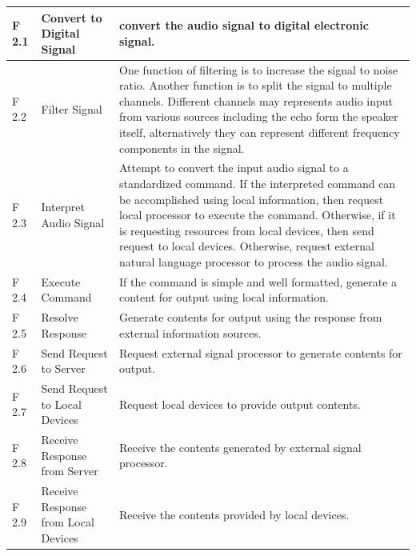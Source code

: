 \documentclass{article}
\begin{document}
\begin{center}
\begin{longtable}{| m{} | m{} | m{} |}
 F 2.1 & Convert to Digital Signal & convert the audio signal to digital electronic signal.\\ 
 \hline
 F 2.2 & Filter Signal & One function of filtering is to increase the signal to noise ratio. Another function is to split the signal to multiple channels. Different channels may represents audio input from various sources including the echo form the speaker itself, alternatively they can represent different frequency components in the signal.\\ 
 \hline
 F 2.3 & Interpret Audio Signal & Attempt to convert the input audio signal to a standardized command. If the interpreted command can be accomplished using local information, then request local processor to execute the command. Otherwise, if it is requesting resources from local devices, then send request to local devices. Otherwise, request external natural language processor to process the audio signal.\\ 
 \hline
 F 2.4 & Execute Command & If the command is simple and  well formatted, generate a content for output using local information.\\ 
 \hline
 F 2.5 & Resolve Response & Generate contents for output using the response from external information sources.\\ 
 \hline
 F 2.6 & Send Request to Server & Request external signal processor to generate contents for output.\\ 
 \hline
 F 2.7 & Send Request to Local Devices & Request local devices to provide output contents.\\ 
 \hline
 F 2.8 & Receive Response from Server & Receive the contents generated by external signal processor.\\ 
 \hline
 F 2.9 & Receive Response from Local Devices & Receive the contents provided by local devices. \\ 
 \hline
\end{longtable}
\end{center}
\end{document}
